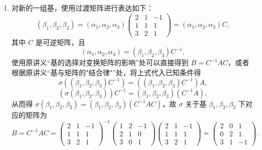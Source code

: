 \documentclass[UTF8,12pt,a4paper,fontset=fandol]{ctexart}
\begin{document}
\begin{solve}
\begin{enumerate}
        \item 对新的一组基，使用过渡矩阵进行表达如下：
              \[(\beta_{1}, \beta_{2}, \beta_{3})=(\alpha_{1}, \alpha_{2}, \alpha_{3})\begin{pmatrix}
                      2 & 1 & -1 \\
                      1 & 1 & 1  \\
                      3 & 2 & 1
                  \end{pmatrix}=(\alpha_{1}, \alpha_{2}, \alpha_{3}) C,\]
              其中 $C$ 是可逆矩阵，且
              \[(\alpha_{1},\alpha_{2},\alpha_{3})=(\beta_{1},\beta_{2},\beta_{3}) C^{-1},\]
              使用原讲义“基的选择对变换矩阵的影响”处可以直接得到 $B=C^{-1} A C$，或者根据原讲义“基与矩阵的"结合律"”处，将上式代入已知条件得
              \[\sigma((\beta_{1}, \beta_{2}, \beta_{3}) C^{-1})=((\beta_{1}, \beta_{2}, \beta_{3}) C^{-1}) A,\]
              \[(\sigma(\beta_{1}, \beta_{2}, \beta_{3})) C^{-1}=(\beta_{1}, \beta_{2}, \beta_{3})(C^{-1} A),\]
              从而得 $\sigma(\beta_{1}, \beta_{2}, \beta_{3})=(\beta_{1}, \beta_{2}, \beta_{3})(C^{-1} A C)$，故 $\sigma$ 关于基 $\beta_{1}, \beta_{2}, \beta_{3}$ 下对应的矩阵为
              \[B=C^{-1} A C = \begin{pmatrix}
                      2 & 1 & -1 \\
                      1 & 1 & 1  \\
                      3 & 2 & 1
                  \end{pmatrix}^{-1}\begin{pmatrix}
                      1 & 2 & -1 \\
                      2 & 1 & 0  \\
                      3 & 0 & 1
                  \end{pmatrix}\begin{pmatrix}
                      2 & 1 & -1 \\
                      1 & 1 & 1  \\
                      3 & 2 & 1
                  \end{pmatrix}=\begin{pmatrix}
                      2 & 0 & 1  \\
                      0 & 2 & 1  \\
                      3 & 1 & -1
                  \end{pmatrix}.\]


\end{enumerate}
\end{solve}
\end{document}
